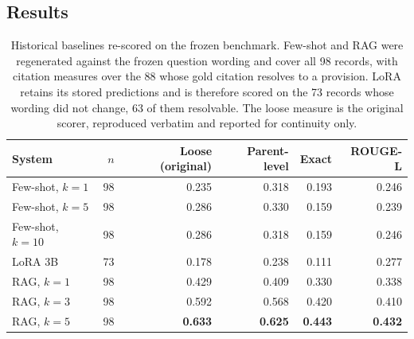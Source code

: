 \subsection{Results}

\begin{table}[htbp]
  \centering
  \caption{Historical baselines re-scored on the frozen benchmark. Few-shot and
  RAG were regenerated against the frozen question wording and cover all 98
  records, with citation measures over the 88 whose gold citation resolves to a
  provision. LoRA retains its stored predictions and is therefore scored on the 73
  records whose wording did not change, 63 of them resolvable. The loose measure
  is the original scorer, reproduced verbatim and reported for continuity only.}
  \label{tab:baselines}
  \begin{tabular}{lrrrrr}
    \toprule
    \textbf{System} & \textbf{$n$} & \textbf{Loose (original)} & \textbf{Parent-level} & \textbf{Exact} & \textbf{ROUGE-L} \\
    \midrule
    Few-shot, $k=1$ & 98 & 0.235 & 0.318 & 0.193 & 0.246 \\
    Few-shot, $k=5$ & 98 & 0.286 & 0.330 & 0.159 & 0.239 \\
    Few-shot, $k=10$ & 98 & 0.286 & 0.318 & 0.159 & 0.246 \\
    LoRA 3B & 73 & 0.178 & 0.238 & 0.111 & 0.277 \\
    RAG, $k=1$ & 98 & 0.429 & 0.409 & 0.330 & 0.338 \\
    RAG, $k=3$ & 98 & 0.592 & 0.568 & 0.420 & 0.410 \\
    RAG, $k=5$ & 98 & \textbf{0.633} & \textbf{0.625} & \textbf{0.443} & \textbf{0.432} \\
    \bottomrule
  \end{tabular}
\end{table}


